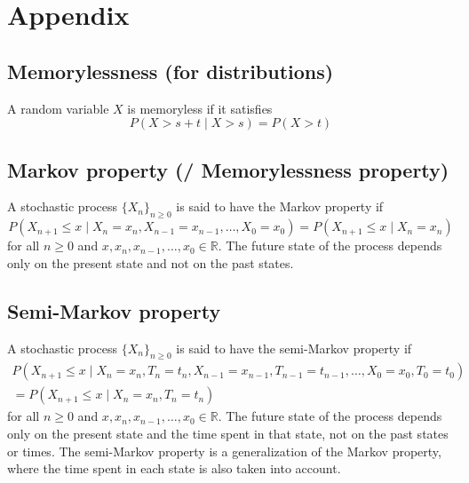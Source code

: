 \section{Appendix}

\subsection{Memorylessness (for distributions)}

A random variable \( X \) is memoryless if it satisfies
\begin{equation}
    P(X > s + t \mid X > s) = P(X > t)
\end{equation}

\subsection{Markov property (/ Memorylessness property)}

A stochastic process \( {\{ X_n \}}_{n \geq 0} \) is said to have the Markov property if
\begin{equation}
    P(X_{n+1} \leq x \mid X_n = x_n, X_{n-1} = x_{n-1}, \ldots, X_0 = x_0) = P(X_{n+1} \leq x \mid X_n = x_n)
\end{equation}
for all \( n \geq 0 \) and \( x, x_n, x_{n-1}, \ldots, x_0 \in \mathbb{R} \).
The future state of the process depends only on the present state and not on the past states.

\subsection{Semi-Markov property}

A stochastic process \( {\{ X_n \}}_{n \geq 0} \) is said to have the semi-Markov property if
\begin{equation}
    \begin{aligned}
        P(X_{n+1} \leq x \mid X_n = x_n, T_n = t_n, X_{n-1} = x_{n-1}, T_{n-1} = t_{n-1}, \ldots, X_0 = x_0, T_0 = t_0)
        \\ =
        P(X_{n+1} \leq x \mid X_n = x_n, T_n = t_n)
    \end{aligned}
\end{equation}
for all \( n \geq 0 \) and \( x, x_n, x_{n-1}, \ldots, x_0 \in \mathbb{R} \).
The future state of the process depends only on the present state and the time spent in that state, not on the past states or times.
The semi-Markov property is a generalization of the Markov property, where the time spent in each state is also taken into account.

